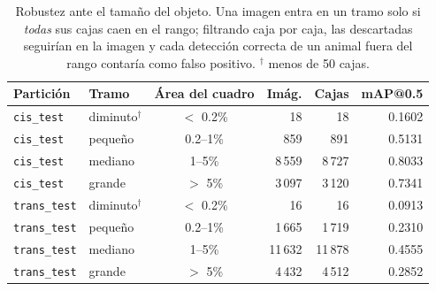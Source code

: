 \begin{table}[t]
  \centering
  \small
  \begin{tabular}{llcrrr}
    \toprule
    Partición & Tramo & Área del cuadro & Imág. & Cajas & mAP@0.5 \\
    \midrule
    \texttt{cis\_test} & diminuto$^{\dagger}$ & $<$ 0.2\% & 18 & 18 & 0.1602 \\
    \texttt{cis\_test} & pequeño & 0.2--1\% & 859 & 891 & 0.5131 \\
    \texttt{cis\_test} & mediano & 1--5\% & 8\,559 & 8\,727 & 0.8033 \\
    \texttt{cis\_test} & grande & $>$ 5\% & 3\,097 & 3\,120 & 0.7341 \\
    \texttt{trans\_test} & diminuto$^{\dagger}$ & $<$ 0.2\% & 16 & 16 & 0.0913 \\
    \texttt{trans\_test} & pequeño & 0.2--1\% & 1\,665 & 1\,719 & 0.2310 \\
    \texttt{trans\_test} & mediano & 1--5\% & 11\,632 & 11\,878 & 0.4555 \\
    \texttt{trans\_test} & grande & $>$ 5\% & 4\,432 & 4\,512 & 0.2852 \\
    \bottomrule
  \end{tabular}
  \caption{Robustez ante el tamaño del objeto. Una imagen entra en un tramo solo si \emph{todas} sus cajas caen en el rango; filtrando caja por caja, las descartadas seguirían en la imagen y cada detección correcta de un animal fuera del rango contaría como falso positivo. $^{\dagger}$ menos de 50 cajas.}
  \label{tab:tamano}
\end{table}
